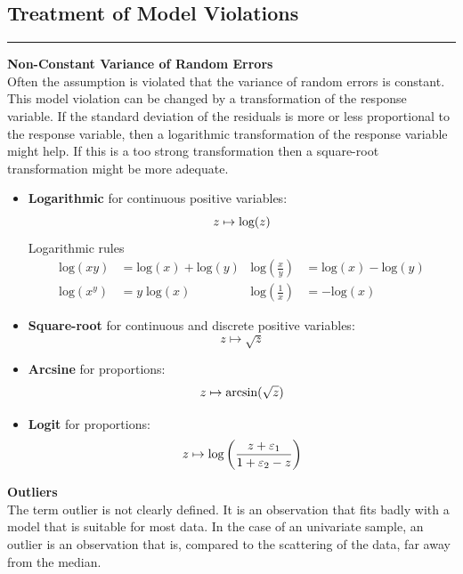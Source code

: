 \subsection{Treatment of Model Violations}
\noindent\rule[\linienAbstand]{\linewidth}{\linienDicke}

\textbf{Non-Constant Variance of Random Errors}\\
Often the assumption is violated that the variance of random errors is constant.\\
This model violation can be changed by a transformation of the response variable. If the standard deviation of the residuals is more or less proportional to the response variable, then a logarithmic transformation of the response variable might help. If this is a too strong transformation then a square-root transformation might be more adequate.
\begin{itemize}
  \item \textbf{Logarithmic} for continuous positive variables:
  \begin{equation}
    z \mapsto \textup{log}(z)
  \end{equation}
  Logarithmic rules
  \begin{align*}
    \text{log}(xy) &= \text{log}(x) + \text{log}(y) &
    \text{log}\left(\frac{x}{y}\right) &= \text{log}(x) - \text{log}(y) \\
    \text{log}\left(x^y\right) &= y\;\text{log}(x) &
    \text{log}\left(\frac{1}{x}\right) &= - \text{log}(x)
  \end{align*}

  \item \textbf{Square-root} for continuous and discrete positive variables:
  \begin{equation}
    z \mapsto \sqrt{z}
  \end{equation}
  \item \textbf{Arcsine} for proportions:
  \begin{equation}
    z \mapsto \textup{arcsin}(\sqrt{z})
  \end{equation}
  \item \textbf{Logit} for proportions:
  \begin{equation}
    z \mapsto \textup{log}\left(\frac{z + \varepsilon_1}{1 + \varepsilon_2 - z} \right)
  \end{equation}
\end{itemize}

\textbf{Outliers}\\
The term outlier is not clearly defined. It is an observation that fits badly with a model that is suitable for most data. In the case of an univariate sample, an outlier is an observation that is, compared to the scattering of the data, far away from the median.\\

